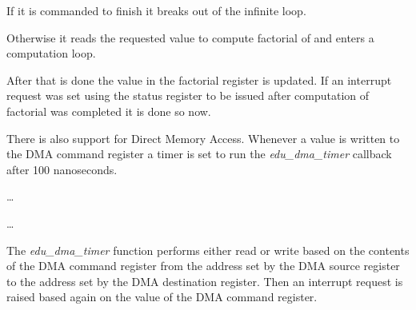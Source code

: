 \begin{codeblock}
    
\end{codeblock}

\noindent
If it is commanded to finish it breaks out of the infinite loop.

\begin{codeblock}
    
\end{codeblock}

\noindent
Otherwise it reads the requested value to compute factorial of and enters
a computation loop.

\begin{codeblock}
    
\end{codeblock}

\noindent
After that is done the value in the factorial register is updated. If an
interrupt request was set using the status register to be issued after
computation of factorial was completed it is done so now.

\begin{codeblock}
    
\end{codeblock}

There is also support for Direct Memory Access. Whenever a value is written to
the DMA command register a timer is set to run the \emph{edu\_dma\_timer}
callback after 100 nanoseconds.

\begin{codeblock}
    
    \dots
    
    \dots
    
\end{codeblock}

The \emph{edu\_dma\_timer} function performs either read or write based on the
contents of the DMA command register from the address set by the DMA source
register to the address set by the DMA destination register. Then an interrupt
request is raised based again on the value of the DMA command register.

